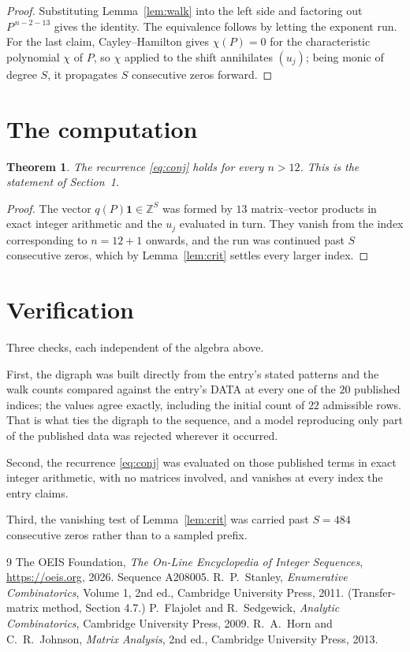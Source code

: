\documentclass[11pt,a4paper]{article}
\theoremstyle{plain}
\newtheorem{theorem}{Theorem}
\theoremstyle{definition}
\begin{document}
\begin{proof}
Substituting Lemma~\ref{lem:walk} into the left side and factoring out
$P^{\,n-2-13}$ gives the identity. The equivalence follows by letting the exponent
run. For the last claim, Cayley--Hamilton gives $\chi(P)=0$ for the characteristic
polynomial $\chi$ of $P$, so $\chi$ applied to the shift annihilates $(u_j)$; being monic of
degree $S$, it propagates $S$ consecutive zeros forward.
\end{proof}

\section{The computation}

\begin{theorem}
The recurrence \eqref{eq:conj} holds for every $n>12$. This is the statement of
Section~1.
\end{theorem}

\begin{proof}
The vector $q(P)\mathbf{1}\in\mathbb{Z}^{S}$ was formed by $13$ matrix--vector
products in exact integer arithmetic and the $u_j$ evaluated in turn. They vanish from the
index corresponding to $n=12+1$ onwards, and the run was continued past $S$ consecutive
zeros, which by Lemma~\ref{lem:crit} settles every larger index.
\end{proof}

\section{Verification}

Three checks, each independent of the algebra above.

First, the digraph was built directly from the entry's stated patterns and the walk counts
compared against the entry's DATA at every one of the $20$ published indices; the
values agree exactly, including the initial count of $22$ admissible rows. That is
what ties the digraph to the sequence, and a model reproducing only part of the published
data was rejected wherever it occurred.

Second, the recurrence \eqref{eq:conj} was evaluated on those published terms in exact
integer arithmetic, with no matrices involved, and vanishes at every index the entry claims.

Third, the vanishing test of Lemma~\ref{lem:crit} was carried past $S=484$ consecutive
zeros rather than to a sampled prefix.

\begin{thebibliography}{9}
 The OEIS Foundation, \emph{The On-Line Encyclopedia of Integer
Sequences}, \url{https://oeis.org}, 2026. Sequence A208005.
 R.~P.~Stanley, \emph{Enumerative Combinatorics}, Volume 1, 2nd ed.,
Cambridge University Press, 2011. (Transfer-matrix method, Section 4.7.)
 P.~Flajolet and R.~Sedgewick, \emph{Analytic Combinatorics}, Cambridge
University Press, 2009.
 R.~A.~Horn and C.~R.~Johnson, \emph{Matrix Analysis}, 2nd ed., Cambridge
University Press, 2013.
\end{thebibliography}
\end{document}
